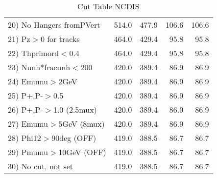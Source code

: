 \begin{table}[h!]
\begin{tabular}{||l||r|r|r|r||}
 20) No Hangers fromPVert &       514.0 &       477.9 &       106.6 &       106.6 \\
 21) Pz$>$0 for tracks    &       464.0 &       429.4 &        95.8 &        95.8 \\
 22) Thprimord$<$0.4      &       464.0 &       429.4 &        95.8 &        95.8 \\
 23) Nunh*fracunh$<$200   &       420.0 &       389.4 &        86.9 &        86.9 \\
 24) Emumu$>$2GeV         &       420.0 &       389.4 &        86.9 &        86.9 \\
 25) P+,P-$>$0.5          &       420.0 &       389.4 &        86.9 &        86.9 \\
 26) P+,P-$>$1.0 (2.5mux) &       420.0 &       389.4 &        86.9 &        86.9 \\
 27) Emumu$>$5GeV  (8mux) &       420.0 &       389.4 &        86.9 &        86.9 \\
 28) Phi12$>$90deg  (OFF) &       419.0 &       388.5 &        86.7 &        86.7 \\
 29) Pmumu$>$10GeV  (OFF) &       419.0 &       388.5 &        86.7 &        86.7 \\
 30) No cut, not set      &       419.0 &       388.5 &        86.7 &        86.7 \\
 \hline
 \hline
 \end{tabular}
 \caption{Cut Table  NCDIS  }
 \label{tab-cut_ncdis}
 \end{table}
